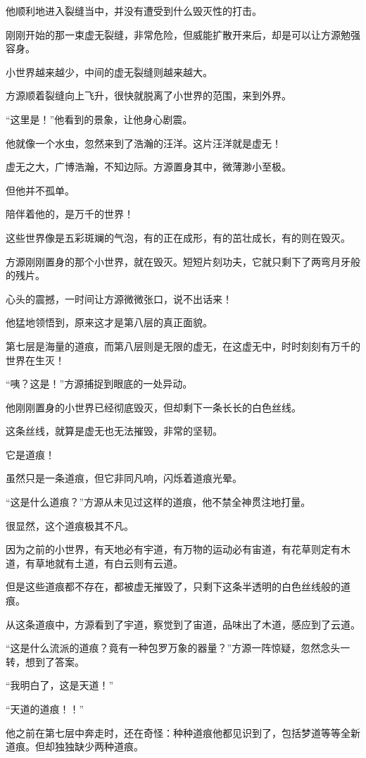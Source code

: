 \begin{this_body}
他顺利地进入裂缝当中，并没有遭受到什么毁灭性的打击。

刚刚开始的那一束虚无裂缝，非常危险，但威能扩散开来后，却是可以让方源勉强容身。

小世界越来越少，中间的虚无裂缝则越来越大。

方源顺着裂缝向上飞升，很快就脱离了小世界的范围，来到外界。

“这里是！”他看到的景象，让他身心剧震。

他就像一个水虫，忽然来到了浩瀚的汪洋。这片汪洋就是虚无！

虚无之大，广博浩瀚，不知边际。方源置身其中，微薄渺小至极。

但他并不孤单。

陪伴着他的，是万千的世界！

这些世界像是五彩斑斓的气泡，有的正在成形，有的茁壮成长，有的则在毁灭。

方源刚刚置身的那个小世界，就在毁灭。短短片刻功夫，它就只剩下了两弯月牙般的残片。

心头的震撼，一时间让方源微微张口，说不出话来！

他猛地领悟到，原来这才是第八层的真正面貌。

第七层是海量的道痕，而第八层则是无限的虚无，在这虚无中，时时刻刻有万千的世界在生灭！

“咦？这是！”方源捕捉到眼底的一处异动。

他刚刚置身的小世界已经彻底毁灭，但却剩下一条长长的白色丝线。

这条丝线，就算是虚无也无法摧毁，非常的坚韧。

它是道痕！

虽然只是一条道痕，但它非同凡响，闪烁着道痕光晕。

“这是什么道痕？”方源从未见过这样的道痕，他不禁全神贯注地打量。

很显然，这个道痕极其不凡。

因为之前的小世界，有天地必有宇道，有万物的运动必有宙道，有花草则定有木道，有草地就有土道，有白云则有云道。

但是这些道痕都不存在，都被虚无摧毁了，只剩下这条半透明的白色丝线般的道痕。

从这条道痕中，方源看到了宇道，察觉到了宙道，品味出了木道，感应到了云道。

“这是什么流派的道痕？竟有一种包罗万象的器量？”方源一阵惊疑，忽然念头一转，想到了答案。

“我明白了，这是天道！”

“天道的道痕！！”

他之前在第七层中奔走时，还在奇怪：种种道痕他都见识到了，包括梦道等等全新道痕。但却独独缺少两种道痕。


\end{this_body}
